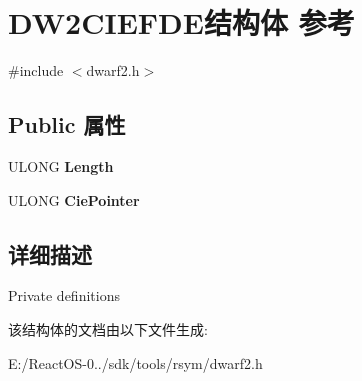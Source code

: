 \hypertarget{struct_d_w2_c_i_e_f_d_e}{}\section{D\+W2\+C\+I\+E\+F\+D\+E结构体 参考}
\label{struct_d_w2_c_i_e_f_d_e}


{\ttfamily \#include $<$dwarf2.\+h$>$}

\subsection*{Public 属性}
\begin{DoxyCompactItemize}
\item 
\mbox{\label{struct_d_w2_c_i_e_f_d_e_a818bee572e731c395304b189f10597c2}} 
U\+L\+O\+NG {\bfseries Length}
\item 
\mbox{\label{struct_d_w2_c_i_e_f_d_e_a28ae72fa6136e371c28941e1b3ecdee4}} 
U\+L\+O\+NG {\bfseries Cie\+Pointer}
\end{DoxyCompactItemize}


\subsection{详细描述}
Private definitions 

该结构体的文档由以下文件生成\+:\begin{DoxyCompactItemize}
\item 
E\+:/\+React\+O\+S-\/0../sdk/tools/rsym/dwarf2.\+h\end{DoxyCompactItemize}
